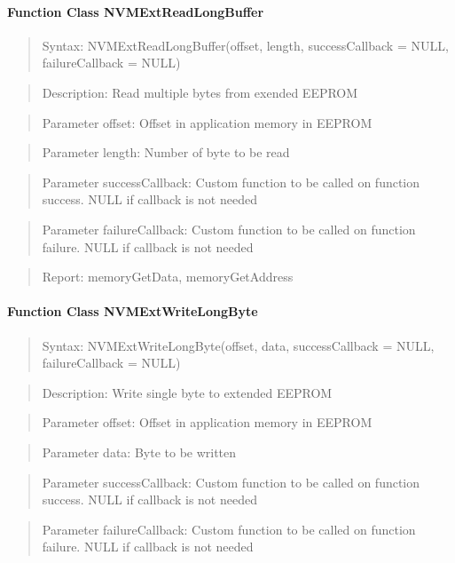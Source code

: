 \paragraph{Function Class NVMExtReadLongBuffer}
\begin{quote}Syntax: NVMExtReadLongBuffer(offset, length, successCallback = NULL, failureCallback = NULL)\end{quote}
\begin{quote}Description: Read multiple bytes from exended EEPROM\end{quote}
\begin{quote}Parameter offset: Offset in application memory in EEPROM\end{quote}
\begin{quote}Parameter length: Number of byte to be read\end{quote}
\begin{quote}Parameter successCallback: Custom function to be called on function success. NULL if callback is not needed\end{quote}
\begin{quote}Parameter failureCallback: Custom function to be called on function failure. NULL if callback is not needed\end{quote}
\begin{quote}Report: memoryGetData, memoryGetAddress\end{quote}

\paragraph{Function Class NVMExtWriteLongByte}
\begin{quote}Syntax: NVMExtWriteLongByte(offset, data, successCallback = NULL, failureCallback = NULL)\end{quote}
\begin{quote}Description: Write single byte to extended EEPROM\end{quote}
\begin{quote}Parameter offset: Offset in application memory in EEPROM\end{quote}
\begin{quote}Parameter data: Byte to be written\end{quote}
\begin{quote}Parameter successCallback: Custom function to be called on function success. NULL if callback is not needed\end{quote}
\begin{quote}Parameter failureCallback: Custom function to be called on function failure. NULL if callback is not needed\end{quote}


